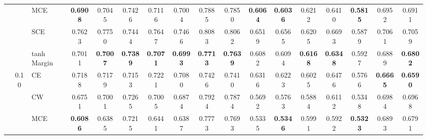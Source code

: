 \documentclass[sigconf,authordraft]{acmart}
\begin{document}
\begin{table*}
{\begin{tabular}{lcl|ccccccc|ccccccc}
                                 &      & MCE &         \textbf{0.6908} &                  0.7045 &              0.7426 &                  0.7116 &           0.7004 &                       0.7885 &                       0.7850 &         \textbf{0.6064} &         \textbf{0.6036} &              0.6212 &                  0.6410 &  \textbf{0.5815} &                       0.6952 &                       0.6911 \\
                                 &      & SCE &                  0.7623 &                  0.7750 &              0.7444 &                  0.7647 &           0.7466 &                       0.8083 &                       0.8062 &                  0.6519 &                  0.6565 &              0.6205 &                  0.6693 &           0.5879 &                       0.7061 &                       0.7059 \\
                                 &      & tanh Margin &                  0.7011 &         \textbf{0.7007} &     \textbf{0.7389} &         \textbf{0.7071} &  \textbf{0.6993} &              \textbf{0.7713} &              \textbf{0.7639} &                  0.6082 &                  0.6094 &     \textbf{0.6168} &         \textbf{0.6348} &           0.5927 &                       0.6889 &              \textbf{0.6802} \\
    \cline{2-17}
                                 & \multirow{5}{*}{0.10} & CE &                  0.7188 &                  0.7179 &              0.7153 &                  0.7221 &           0.7080 &                       0.7426 &                       0.7410 &                  0.6316 &                  0.6223 &              0.6025 &                  0.6476 &           0.5766 &              \textbf{0.6665} &              \textbf{0.6590} \\
                                 &      & CW &                  0.6751 &                  0.7001 &              0.7265 &                  0.7005 &           0.6874 &                       0.7924 &                       0.7874 &                  0.5692 &                  0.5763 &              0.5884 &                  0.6112 &           0.5348 &                       0.6984 &                       0.6968 \\
                                 &      & MCE &         \textbf{0.6086} &                  0.6385 &              0.7215 &                  0.6441 &           0.6387 &                       0.7773 &                       0.7693 &                  0.5335 &         \textbf{0.5346} &              0.5991 &                  0.5922 &  \textbf{0.5323} &                       0.6893 &                       0.6791 \\

\end{tabular}}
\end{table*}
\end{document}
